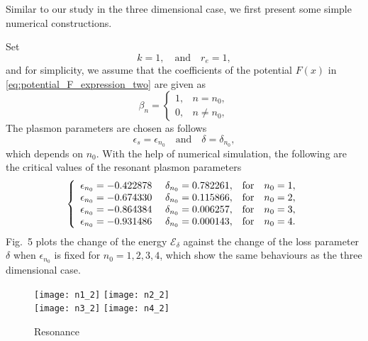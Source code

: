 \documentclass[11pt,reqno,twoside]{amsart}
\theoremstyle{definition}
\theoremstyle{remark}
\numberwithin{equation}{section}
\begin{document}
Similar to our study in the three dimensional case, we first present some simple numerical constructions.

Set
\[
 k=1,\quad \mbox{and} \quad r_e=1,
\]
and for simplicity, we assume that the coefficients of the potential $F(x)$ in \eqref{eq:potential_F_expression_two} are given as
\begin{equation}
  \beta_n=\left\{
            \begin{array}{ll}
              1, & n=n_0, \\
              0, & n\neq n_0,
            \end{array}
          \right.
\end{equation}
The plasmon parameters are chosen as follows
\begin{equation}
  \epsilon_s=\epsilon_{n_0} \quad \mbox{and} \quad \delta=\delta_{n_0},
\end{equation}
which depends on $n_0$. With the help of numerical simulation, the following are the critical values of the resonant plasmon parameters
\begin{equation}\label{eq:data_two}
  \left\{
    \begin{array}{ll}
      \epsilon_{n_0}=-0.422878$ \quad $\delta_{n_0}=0.782261, & \mbox{for}\quad n_0=1, \\
      \epsilon_{n_0}=-0.674330$ \quad $\delta_{n_0}=0.115866, & \mbox{for}\quad n_0=2, \\
      \epsilon_{n_0}=-0.864384$ \quad $\delta_{n_0}=0.006257, & \mbox{for}\quad n_0=3, \\
      \epsilon_{n_0}=-0.931486$ \quad $\delta_{n_0}=0.000143, & \mbox{for}\quad n_0=4.
    \end{array}
  \right.
\end{equation}
Fig.~5 plots the change of the energy $\mathscr{E}_\delta$ against the change of the loss parameter $\delta$ when $\epsilon_{n_0}$ is fixed for $n_0=1,2,3,4$, which show the same behaviours as the three dimensional case.

\begin{figure}
  \centering
 {\texttt{[image: n1\_2]}}
 {\texttt{[image: n2\_2]}\\}
 {\texttt{[image: n3\_2]}}
 {\texttt{[image: n4\_2]}}
  \caption{Resonance}
\end{figure}
\end{document}
